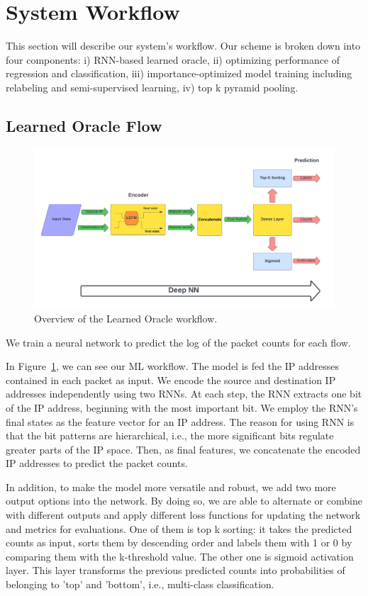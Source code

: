 \section{System Workflow}

This section will describe our system's workflow. Our scheme is broken down into four components: i) RNN-based learned oracle, ii) optimizing performance of regression and classification, iii) importance-optimized model training including relabeling and semi-supervised learning, iv) top k pyramid pooling. 

\subsection{Learned Oracle Flow}

\begin{figure}[htbp]
\centering
\includegraphics[width=1\textwidth]{images/workflow/learned oracle(4).png}
\caption{Overview of the Learned Oracle workflow.}
\label{fig:ml_flow}
\end{figure}

We train a neural network to predict the log of the packet counts for each flow. 

In Figure~\ref{fig:ml_flow}, we can see our ML workflow. The model is fed the IP addresses contained in each packet as input. We encode the source and destination IP addresses independently using two RNNs. At each step, the RNN extracts one bit of the IP address, beginning with the most important bit. We employ the RNN's final states as the feature vector for an IP address. The reason for using RNN is that the bit patterns are hierarchical, i.e., the more significant bits regulate greater parts of the IP space. Then, as final features, we concatenate the encoded IP addresses to predict the packet counts. 

In addition, to make the model more versatile and robust, we add two more output options into the network. By doing so, we are able to alternate or combine with different outputs and apply different loss functions for updating the network and metrics for evaluations. One of them is top k sorting: it takes the predicted counts as input, sorts them by descending order and labels them with 1 or 0 by comparing them with the k-threshold value. The other one is sigmoid activation layer. This layer transforms the previous predicted counts into probabilities of belonging to 'top' and 'bottom', i.e., multi-class classification.

